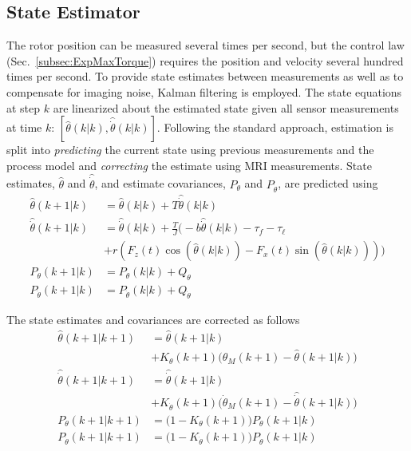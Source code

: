 \documentclass[journal]{IEEEtran}
\begin{document}
\subsection{State Estimator}
The rotor position can be measured several times per second, but the control law (Sec.\ \ref{subsec:ExpMaxTorque}) requires the position and velocity several hundred times per second.
To provide state estimates between measurements as well as to compensate for imaging noise, Kalman filtering is employed. The state equations at step $k$ are linearized about the estimated state given all sensor measurements at time $k$: $[\hat{\theta}(k|k),\hat{\dot{\theta}}(k|k) ]$. Following the standard approach, estimation is split into \emph{predicting} the current state using previous measurements and the process model and  \emph{correcting} the estimate using MRI measurements. State estimates, $\hat{\theta}$ and $\hat{\dot{\theta}}$, and estimate covariances, $P_{\theta}$ and $P_{\dot{\theta}}$, are predicted using
\begin{align}
\hat{\theta}(k+1|k) &= \hat{\theta}(k|k) + T \hat{\dot{\theta}}(k|k) \nonumber \\
\hat{\dot{\theta}}(k+1|k) &= \hat{\dot{\theta}}(k|k) +  \frac{T}{J}\bigg(-b\hat{\dot{\theta}}(k|k)  -\tau_{f}-\tau_{\ell}  \nonumber \\
&  + r \left( F_z(t) \cos(\hat{\theta}(k|k) ) - F_x(t) \sin(\hat{\theta}(k|k) ) \right)\bigg) \nonumber \\
P_{\theta}(k+1|k) &= P_{\theta}(k|k)  + Q_{\theta}\nonumber \\
P_{\dot{\theta}}(k+1|k) &= P_{\dot{\theta}}(k|k)  + Q_{\dot{\theta}}
\label{eq:StateUpdate}
\end{align}

The state estimates and covariances are corrected as follows
\begin{align}
\hat{\theta}(k+1|k+1) &= \hat{\theta}(k+1|k) \nonumber \\
& \left. + K_{\theta}(k+1)\Big(\theta_M(k+1) -\hat{\theta}(k+1|k)\Big)  \right.\nonumber \\
\hat{\dot{\theta}}(k+1|k+1) &= \hat{\dot{\theta}}(k+1|k) \nonumber \\
& \left. +  K_{\dot{\theta}}(k+1)\Big(\dot{\theta}_M(k+1) -\hat{\dot{\theta}}(k+1|k)\Big)  \right.\nonumber \\
P_{\theta}(k+1|k+1) &= \Big( 1 -  K_{\theta}(k+1)    \Big)P_{\theta}(k+1|k)   \nonumber\\
P_{\dot{\theta}}(k+1|k+1) &= \Big( 1 -  K_{\dot{\theta}}(k+1)    \Big)P_{\dot{\theta}}(k+1|k)  
\label{eq:StateCorrection}
\end{align}
\end{document}
